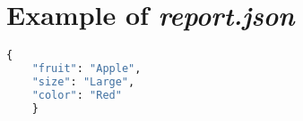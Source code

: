 \chapter{Example of \emph{report.json}} \label{app:report_example}

\begin{lstlisting}[language=Python]
    {
    "fruit": "Apple",
    "size": "Large",
    "color": "Red"
    }
\end{lstlisting}